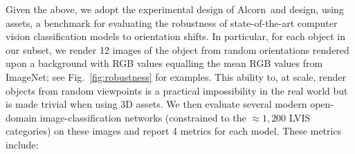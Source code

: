Given the above, we adopt the experimental design of Alcorn~\etal and design, using \data assets, a benchmark for evaluating the robustness of state-of-the-art computer vision classification models to orientation shifts. In particular, for each object in our \datalvis subset, we render 12 images of the object from random orientations rendered upon a background with RGB values equalling the mean RGB values from ImageNet; see Fig.~\ref{fig:robustness} for examples. This ability to, at scale, render objects from random viewpoints is a practical impossibility in the real world but is made trivial when using 3D assets. We then evaluate several modern open-domain image-classification networks (constrained to the ${\approx}1{,}200$ \textsc{LVIS} categories) on these images and report 4 metrics for each model. These metrics include:

\begin{table}[t!]
    \centering
    \caption{Evaluating 0-shot CLIP classification models on our rotational robustness benchmark. $\Delta$Top-1 denotes the difference between \emph{Top-1 Any Rotation} and \emph{Top-1 Random Rotation}. Models are strongly overfit to standard views of objects.}
    \label{tab:robustness}
    \vspace{-1em}
\end{table}

